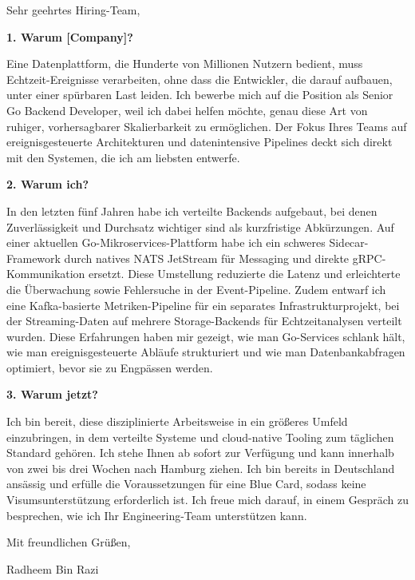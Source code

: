 \documentclass[11pt,a4paper]{coverletter}
\begin{document}

\opening{Sehr geehrtes Hiring-Team,}

\vspace{8pt}\noindent\textbf{1. Warum [Company]?}\par\vspace{3pt}

Eine Datenplattform, die Hunderte von Millionen Nutzern bedient, muss Echtzeit-Ereignisse verarbeiten, ohne dass die Entwickler, die darauf aufbauen, unter einer spürbaren Last leiden. Ich bewerbe mich auf die Position als Senior Go Backend Developer, weil ich dabei helfen möchte, genau diese Art von ruhiger, vorhersagbarer Skalierbarkeit zu ermöglichen. Der Fokus Ihres Teams auf ereignisgesteuerte Architekturen und datenintensive Pipelines deckt sich direkt mit den Systemen, die ich am liebsten entwerfe.

\vspace{8pt}\noindent\textbf{2. Warum ich?}\par\vspace{3pt}

In den letzten fünf Jahren habe ich verteilte Backends aufgebaut, bei denen Zuverlässigkeit und Durchsatz wichtiger sind als kurzfristige Abkürzungen. Auf einer aktuellen Go-Mikroservices-Plattform habe ich ein schweres Sidecar-Framework durch natives NATS JetStream für Messaging und direkte gRPC-Kommunikation ersetzt. Diese Umstellung reduzierte die Latenz und erleichterte die Überwachung sowie Fehlersuche in der Event-Pipeline. Zudem entwarf ich eine Kafka-basierte Metriken-Pipeline für ein separates Infrastrukturprojekt, bei der Streaming-Daten auf mehrere Storage-Backends für Echtzeitanalysen verteilt wurden. Diese Erfahrungen haben mir gezeigt, wie man Go-Services schlank hält, wie man ereignisgesteuerte Abläufe strukturiert und wie man Datenbankabfragen optimiert, bevor sie zu Engpässen werden.

\vspace{8pt}\noindent\textbf{3. Warum jetzt?}\par\vspace{3pt}

Ich bin bereit, diese disziplinierte Arbeitsweise in ein größeres Umfeld einzubringen, in dem verteilte Systeme und cloud-native Tooling zum täglichen Standard gehören. Ich stehe Ihnen ab sofort zur Verfügung und kann innerhalb von zwei bis drei Wochen nach Hamburg ziehen. Ich bin bereits in Deutschland ansässig und erfülle die Voraussetzungen für eine Blue Card, sodass keine Visumsunterstützung erforderlich ist. Ich freue mich darauf, in einem Gespräch zu besprechen, wie ich Ihr Engineering-Team unterstützen kann.

\closing{Mit freundlichen Grüßen,}{Radheem Bin Razi}
\end{document}
